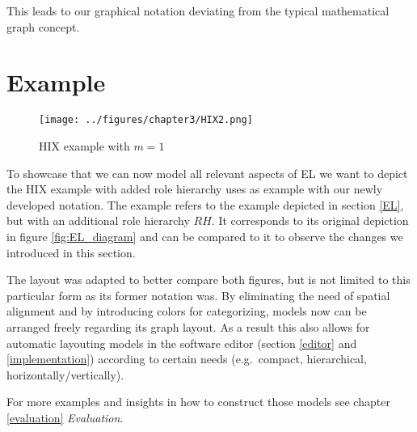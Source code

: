 \documentclass[twoside, openright, 12pt]{book}
\begin{document}
This leads to our graphical notation deviating from the typical mathematical graph concept.



\section{Example}
\label{gsl_example}

\begin{figure}[htb]
	\centering
	\texttt{[image: ../figures/chapter3/HIX2.png]}
	\caption{HIX example with $m=1$ \citep{Amthor18}}
	\label{fig:HIX2}
\end{figure}

\noindent
To showcase that we can now model all relevant aspects of EL we want to depict the HIX example with added role hierarchy \cite{Amthor18} uses as example with our newly developed notation.
The example refers to the example depicted in section \ref{EL}, but with an additional role hierarchy $RH$.
It corresponds to its original depiction in figure \ref{fig:EL_diagram} and can be compared to it to observe the changes we introduced in this section.

The layout was adapted to better compare both figures, but is not limited to this particular form as its former notation was.
By eliminating the need of spatial alignment and by introducing colors for categorizing, models now can be arranged freely regarding its graph layout.
As a result this also allows for automatic layouting models in the software editor (section \ref{editor} and \ref{implementation}) according to certain needs (e.g.~compact, hierarchical, horizontally/vertically).

For more examples and insights in how to construct those models see chapter \ref{evaluation} \textit{Evaluation}.

\end{document}
